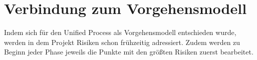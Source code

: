 \documentclass[../review_1.tex]{subfiles}
\begin{document}
\section{Verbindung zum Vorgehensmodell}
Indem sich für den Unified Process als Vorgehensmodell entschieden wurde, werden in dem Projekt Risiken schon frühzeitig adressiert. Zudem werden zu Beginn jeder Phase jeweils die Punkte mit den größten Risiken zuerst bearbeitet.
\end{document}
